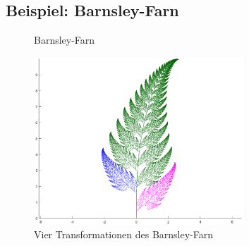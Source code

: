 \subsection{Beispiel: Barnsley-Farn}
\begin{figure}
	\label{ifs:farn}
	\centering
	\caption{Barnsley-Farn}
\end{figure}
\begin{figure}
	\label{ifs:farncolor}
	\centering
	\includegraphics[width=0.7\textwidth]{papers/ifs/images/farncolor}
	\caption{Vier Transformationen des Barnsley-Farn}
\end{figure}
